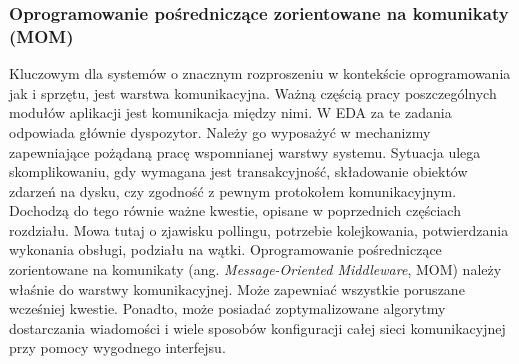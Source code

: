 \documentclass[a4paper]{book}
\newcommand{\obcy}[2]{{\selectlanguage{#1}#2}}
\newcommand{\ang}[1]{\emph{\obcy{british}{#1}}}
\begin{document}
{\subsubsection{Oprogramowanie pośredniczące zorientowane na komunikaty (MOM)}
Kluczowym dla systemów o znacznym rozproszeniu w kontekście oprogramowania jak i sprzętu, jest warstwa komunikacyjna. Ważną częścią pracy poszczególnych modułów aplikacji jest komunikacja między nimi. W EDA za te zadania odpowiada głównie dyspozytor. Należy go wyposażyć w mechanizmy zapewniające pożądaną pracę wspomnianej warstwy systemu. Sytuacja ulega skomplikowaniu, gdy wymagana jest transakcyjność, składowanie obiektów zdarzeń na dysku, czy zgodność z pewnym protokołem komunikacyjnym. Dochodzą do tego równie ważne kwestie, opisane w poprzednich częściach rozdziału. Mowa tutaj o zjawisku pollingu, potrzebie kolejkowania, potwierdzania wykonania obsługi, podziału na wątki. Oprogramowanie pośredniczące zorientowane na komunikaty (ang. \ang{Message-Oriented Middleware}, MOM) należy właśnie do warstwy komunikacyjnej. Może zapewniać wszystkie poruszane wcześniej kwestie. Ponadto, może posiadać zoptymalizowane algorytmy dostarczania wiadomości i wiele sposobów konfiguracji całej sieci komunikacyjnej przy pomocy wygodnego interfejsu. 

}
\end{document}
